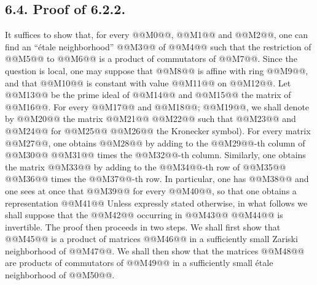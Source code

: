
\subsection*{6.4. Proof of 6.2.2.}
It suffices to show that, for every @@M0@@, @@M1@@ and @@M2@@, one can find an ``étale neighborhood'' @@M3@@ of @@M4@@ such that the restriction of @@M5@@ to @@M6@@ is a product of commutators of @@M7@@. Since the question is local, one may suppose that @@M8@@ is affine with ring @@M9@@, and that @@M10@@ is constant with value @@M11@@ on @@M12@@. Let @@M13@@ be the prime ideal of @@M14@@ and @@M15@@ the matrix of @@M16@@. For every @@M17@@ and @@M18@@; @@M19@@, we shall denote by @@M20@@ the matrix @@M21@@ @@M22@@ such that @@M23@@ and @@M24@@ for @@M25@@ @@M26@@ the Kronecker symbol). For every matrix @@M27@@, one obtains @@M28@@ by adding to the @@M29@@-th column of @@M30@@ @@M31@@ times the @@M32@@-th column. Similarly, one obtains the matrix @@M33@@ by adding to the @@M34@@-th row of @@M35@@ @@M36@@ times the @@M37@@-th row. In particular, one has
@@M38@@
and one sees at once that
@@M39@@
for every @@M40@@, so that one obtains a representation
@@M41@@
Unless expressly stated otherwise, in what follows we shall suppose that the @@M42@@ occurring in @@M43@@ @@M44@@ is invertible.
The proof then proceeds in two steps. We shall first show that @@M45@@ is a product of matrices @@M46@@ in a sufficiently small Zariski neighborhood of @@M47@@. We shall then show that the matrices @@M48@@ are products of commutators of @@M49@@ in a sufficiently small étale neighborhood of @@M50@@.
